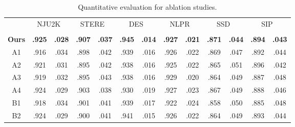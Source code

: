 \documentclass[10pt,twocolumn,letterpaper]{article}
\begin{document}
\begin{table}[t!]
  \centering
  \renewcommand{\arraystretch}{1.2}
  \renewcommand{\tabcolsep}{0.3mm}
  \caption{Quantitative evaluation for ablation studies.
  } 

  \scriptsize
  \begin{tabular}{c|cc|cc|cc|cc|cc|cc}
  \hline\toprule

    &\multicolumn{2}{c|}{NJU2K~\cite{ju2014depth}}
    &\multicolumn{2}{c|}{STERE~\cite{niu2012leveraging}}
    &\multicolumn{2}{c|}{DES~\cite{cheng2014depth}}
    &\multicolumn{2}{c|}{NLPR~\cite{peng2014rgbd}}
    &\multicolumn{2}{c|}{SSD~\cite{zhu2017three}}
    &\multicolumn{2}{c}{SIP~\cite{fan2019rethinking}}\\


    &   &
    &    &
    &    &
    &    &
    &    &
    &    & \\


  \midrule
    \textbf{Ours}
    & \textbf{.925}   & \textbf{.028}
    & \textbf{.907}   & \textbf{.037}
    & \textbf{.945}   & \textbf{.014}
    & \textbf{.927}   & \textbf{.021}
    & \textbf{.871}   & \textbf{.044}
    & \textbf{.894}   & \textbf{.043} 	\\

   \midrule

    A1
    & .916   & .034
    & .898   & .042
    & .939   & .016
    & .926   & .022
    & .869   & .047
    & .892   & .044 	\\

    A2
    & .921   & .031
    & .895   & .042
    & .938   & .016
    & .925   & .022
    & .865   & .051
    & .896   & .042 	\\

    A3
    & .919   & .032
    & .895   & .043
    & .938   & .016
    & .929   & .020
    & .864   & .049
    & .887   & .048 	\\

    A4
    & .924   & .029
    & .903   & .038
    & .930   & .019
    & .927   & .023
    & .867   & .049
    & .888   & .046 	\\


    \midrule

    B1
    & .918   & .034
    & .901   & .041
    & .939   & .017
    & .922   & .024
    & .858   & .050
    & .885   & .048 	\\

    B2
    & .924   & .029
    & .900   & .041
    & .941   & .015
    & .926   & .022
    & .864   & .049
    & .893   & .044 	\\


\end{tabular}
\end{table}
\end{document}

